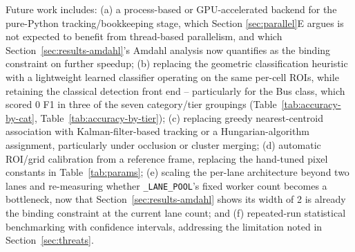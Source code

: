 \documentclass[conference]{IEEEtran}
\newcommand{\code}[1]{\texttt{#1}}
\begin{document}
Future work includes: (a) a process-based or GPU-accelerated backend for
the pure-Python tracking/bookkeeping stage, which Section
\ref{sec:parallel}E argues is not expected to benefit from thread-based
parallelism, and which Section~\ref{sec:results-amdahl}'s Amdahl analysis
now quantifies as the binding constraint on further speedup; (b)
replacing the geometric classification heuristic with a lightweight
learned classifier operating on the same per-cell ROIs, while retaining
the classical detection front end -- particularly for the Bus class,
which scored 0 F1 in three of the seven category/tier groupings
(Table~\ref{tab:accuracy-by-cat}, Table~\ref{tab:accuracy-by-tier}); (c)
replacing greedy nearest-centroid association with Kalman-filter-based
tracking or a Hungarian-algorithm assignment, particularly under
occlusion or cluster merging; (d) automatic ROI/grid calibration from a
reference frame, replacing the hand-tuned pixel constants in
Table~\ref{tab:params}; (e) scaling the per-lane architecture beyond two
lanes and re-measuring whether \code{\_LANE\_POOL}'s fixed worker count
becomes a bottleneck, now that Section~\ref{sec:results-amdahl} shows
its width of 2 is already the binding constraint at the current lane
count; and (f) repeated-run statistical benchmarking with confidence
intervals,
addressing the limitation noted in Section~\ref{sec:threats}.
\end{document}
